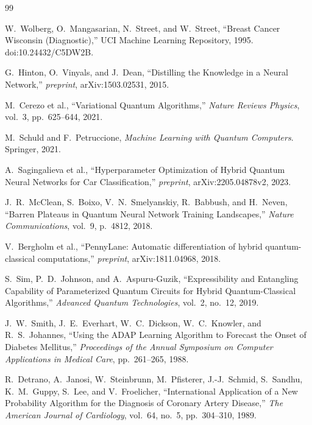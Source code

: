 \documentclass[11pt,a4paper]{article}
\begin{document}
\begin{thebibliography}{99}

W.~Wolberg, O.~Mangasarian, N.~Street, and W.~Street,
``Breast Cancer Wisconsin (Diagnostic),'' UCI Machine Learning Repository, 1995.
doi:10.24432/C5DW2B.

G.~Hinton, O.~Vinyals, and J.~Dean,
``Distilling the Knowledge in a Neural Network,''
\textit{preprint}, arXiv:1503.02531, 2015.

M.~Cerezo et al.,
``Variational Quantum Algorithms,''
\textit{Nature Reviews Physics}, vol.~3, pp.~625--644, 2021.

M.~Schuld and F.~Petruccione,
\textit{Machine Learning with Quantum Computers}.
Springer, 2021.

A.~Sagingalieva et al.,
``Hyperparameter Optimization of Hybrid Quantum Neural Networks for Car Classification,''
\textit{preprint}, arXiv:2205.04878v2, 2023.

J.~R.~McClean, S.~Boixo, V.~N.~Smelyanskiy, R.~Babbush, and H.~Neven,
``Barren Plateaus in Quantum Neural Network Training Landscapes,''
\textit{Nature Communications}, vol.~9, p.~4812, 2018.

V.~Bergholm et al.,
``PennyLane: Automatic differentiation of hybrid quantum-classical computations,''
\textit{preprint}, arXiv:1811.04968, 2018.

S.~Sim, P.~D.~Johnson, and A.~Aspuru-Guzik,
``Expressibility and Entangling Capability of Parameterized Quantum Circuits for Hybrid
Quantum-Classical Algorithms,''
\textit{Advanced Quantum Technologies}, vol.~2, no.~12, 2019.

J.~W.~Smith, J.~E.~Everhart, W.~C.~Dickson, W.~C.~Knowler, and R.~S.~Johannes,
``Using the ADAP Learning Algorithm to Forecast the Onset of Diabetes Mellitus,''
\textit{Proceedings of the Annual Symposium on Computer Applications in Medical Care},
pp.~261--265, 1988.

R.~Detrano, A.~Janosi, W.~Steinbrunn, M.~Pfisterer, J.-J.~Schmid, S.~Sandhu,
K.~M.~Guppy, S.~Lee, and V.~Froelicher,
``International Application of a New Probability Algorithm for the Diagnosis of Coronary
Artery Disease,''
\textit{The American Journal of Cardiology}, vol.~64, no.~5, pp.~304--310, 1989.


\end{thebibliography}
\end{document}
